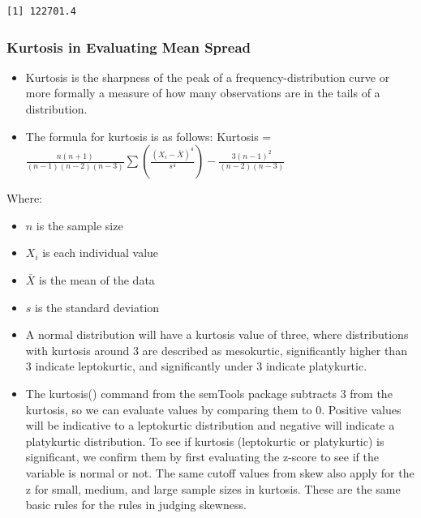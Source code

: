\documentclass[
  letterpaper,
  DIV=11,
  numbers=noendperiod]{scrreprt}
\newenvironment{Shaded}{\begin{snugshade}}{\end{snugshade}}
\newcommand{\AttributeTok}[1]{\textcolor[rgb]{0.40,0.45,0.13}{#1}}
\newcommand{\ConstantTok}[1]{\textcolor[rgb]{0.56,0.35,0.01}{#1}}
\newcommand{\FunctionTok}[1]{\textcolor[rgb]{0.28,0.35,0.67}{#1}}
\newcommand{\NormalTok}[1]{\textcolor[rgb]{0.00,0.23,0.31}{#1}}
\newcommand{\SpecialCharTok}[1]{\textcolor[rgb]{0.37,0.37,0.37}{#1}}
\providecommand{\tightlist}{%
  \setlength{\itemsep}{0pt}\setlength{\parskip}{0pt}}\usepackage{longtable,booktabs,array}
\begin{document}
\begin{Shaded}
\end{Shaded}

\begin{verbatim}
[1] 122701.4
\end{verbatim}

\subsubsection{Kurtosis in Evaluating Mean
Spread}\label{kurtosis-in-evaluating-mean-spread}

\begin{itemize}
\item
  Kurtosis is the sharpness of the peak of a frequency-distribution
  curve or more formally a measure of how many observations are in the
  tails of a distribution.
\item
  The formula for kurtosis is as follows: Kurtosis =
  \(\frac{n(n+1)}{(n-1)(n-2)(n-3)} \sum \left( \frac{(X_i - \bar{X})^4}{s^4} \right) - \frac{3(n-1)^2}{(n-2)(n-3)}\)
\end{itemize}

Where:

\begin{itemize}
\tightlist
\item
  \(n\) is the sample size
\item
  \(X_i\) is each individual value
\item
  \(\bar{X}\) is the mean of the data
\item
  \(s\) is the standard deviation
\item
  A normal distribution will have a kurtosis value of three, where
  distributions with kurtosis around 3 are described as mesokurtic,
  significantly higher than 3 indicate leptokurtic, and significantly
  under 3 indicate platykurtic.
\item
  The kurtosis() command from the semTools package subtracts 3 from the
  kurtosis, so we can evaluate values by comparing them to 0. Positive
  values will be indicative to a leptokurtic distribution and negative
  will indicate a platykurtic distribution. To see if kurtosis
  (leptokurtic or platykurtic) is significant, we confirm them by first
  evaluating the z-score to see if the variable is normal or not. The
  same cutoff values from skew also apply for the z for small, medium,
  and large sample sizes in kurtosis. These are the same basic rules for
  the rules in judging skewness.
\end{itemize}
\end{document}
